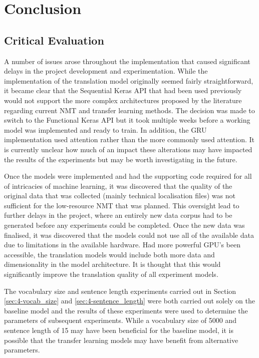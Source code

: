 
\chapter{Conclusion}
\newpage
\section{Critical Evaluation}


A number of issues arose throughout the implementation that caused significant delays in the project development and experimentation. While the implementation of the translation model originally seemed fairly straightforward, it became clear that the Sequential Keras API that had been used previously would not support the more complex architectures proposed by the literature regarding current \acrshort{NMT} and transfer learning methods. The decision was made to switch to the Functional Keras API but it took multiple weeks before a working model was implemented and ready to train. In addition, the \acrshort{GRU} implementation used \cite{bahdanau_neural_2016} attention rather than the more commonly used \cite{luong_effective_2015} attention. It is currently unclear how much of an impact these alterations may have impacted the results of the experiments but may be worth investigating in the future.

Once the models were implemented and had the supporting code required for all of intricacies of machine learning, it was discovered that the quality of the original data that was collected (mainly technical localisation files) was not sufficient for the low-resource \acrshort{NMT} that was planned. This oversight lead to further delays in the project, where an entirely new data corpus had to be generated before any experiments could be completed. Once the new data was finalised, it was discovered that the models could not use all of the available data due to limitations in the available hardware. Had more powerful GPU's been accessible, the translation models would include both more data and dimensionality in the model architecture. It is thought that this would significantly improve the translation quality of all experiment models.

The vocabulary size and sentence length experiments carried out in Section \ref{sec:4-vocab_size} and \ref{sec:4-sentence_length} were both carried out solely on the baseline model and the results of these experiments were used to determine the parameters of subsequent experiments. While a vocabulary size of 5000 and sentence length of 15 may have been beneficial for the baseline model, it is possible that the transfer learning models may have benefit from alternative parameters.

